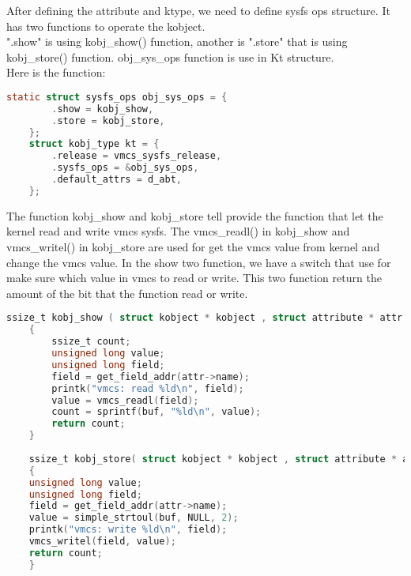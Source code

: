 \documentclass[10pt,draftclsnofoot,peerreview ,letterpaper,onecolumn,]{IEEEtran}
\begin{document}
	After defining the attribute and ktype, we need to define sysfs ops structure. It has two functions to operate the kobject. \\
	".show" is using kobj\_show() function, another is ".store" that is using kobj\_store() function. obj\_sys\_ops function is use in Kt structure. \\ Here is the function: \\
	
	\begin{lstlisting}[language=C]
	static struct sysfs_ops obj_sys_ops = {
		.show = kobj_show,
		.store = kobj_store,
	};
	struct kobj_type kt = {
		.release = vmcs_sysfs_release,
		.sysfs_ops = &obj_sys_ops,
		.default_attrs = d_abt,
	};
	\end{lstlisting}
	The function kobj\_show and kobj\_store tell provide the function that let the kernel read and write vmcs sysfs. The vmcs\_readl() in kobj\_show and vmcs\_writel() in kobj\_store are used for get the vmcs value from kernel and change the vmcs value. In the show two function, we have a switch that use for make sure which value in vmcs to read or write. This two function return the amount of the bit that the function read or write. 
	
	\begin{lstlisting}[language=C]
	ssize_t kobj_show ( struct kobject * kobject , struct attribute * attr , char * buf )
	{
		ssize_t count;
		unsigned long value;
		unsigned long field;
		field = get_field_addr(attr->name);
		printk("vmcs: read %ld\n", field);
		value = vmcs_readl(field);
		count = sprintf(buf, "%ld\n", value);
		return count;
	}
	
	ssize_t kobj_store( struct kobject * kobject , struct attribute * attr , const char *buf , size_t count)
	{
	unsigned long value;
	unsigned long field;
	field = get_field_addr(attr->name);
	value = simple_strtoul(buf, NULL, 2);
	printk("vmcs: write %ld\n", field);
	vmcs_writel(field, value);
	return count;
	}
	\end{lstlisting}
	
	
\end{document}

